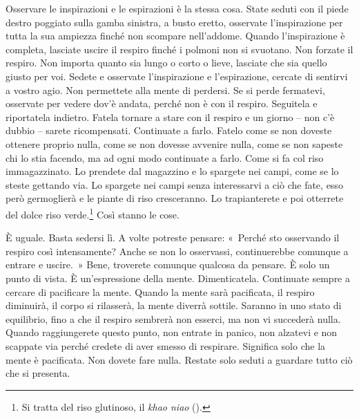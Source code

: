 Osservare le inspirazioni e le espirazioni è la stessa cosa. State
seduti con il piede destro poggiato sulla gamba sinistra, a busto
eretto, osservate l'inspirazione per tutta la sua ampiezza finché non
scompare nell'addome. Quando l'inspirazione è completa, lasciate uscire
il respiro finché i polmoni non si svuotano. Non forzate il respiro. Non
importa quanto sia lungo o corto o lieve, lasciate che sia quello giusto
per voi. Sedete e osservate l'inspirazione e l'espirazione, cercate di
sentirvi a vostro agio. Non permettete alla mente di perdersi. Se si
perde fermatevi, osservate per vedere dov'è andata, perché non è con il
respiro. Seguitela e riportatela indietro. Fatela tornare a stare con il
respiro e un giorno -- non c'è dubbio -- sarete ricompensati. Continuate
a farlo. Fatelo come se non doveste ottenere proprio nulla, come se non
dovesse avvenire nulla, come se non sapeste chi lo stia facendo, ma ad
ogni modo continuate a farlo. Come si fa col riso immagazzinato. Lo
prendete dal magazzino e lo spargete nei campi, come se lo steste
gettando via. Lo spargete nei campi senza interessarvi a ciò che fate,
esso però germoglierà e le piante di riso cresceranno. Lo trapianterete
e poi otterrete del dolce riso verde.\footnote{Si tratta del riso
  glutinoso, il \emph{khao niao} ().} Così stanno le cose.

È uguale. Basta sedersi lì. A volte potreste pensare: «~Perché sto
osservando il respiro così intensamente? Anche se non lo osservassi,
continuerebbe comunque a entrare e uscire.~» Bene, troverete comunque
qualcosa da pensare. È solo un punto di vista. È un'espressione della
mente. Dimenticatela. Continuate sempre a cercare di pacificare la
mente. Quando la mente sarà pacificata, il respiro diminuirà, il corpo
si rilasserà, la mente diverrà sottile. Saranno in uno stato di
equilibrio, fino a che il respiro sembrerà non esserci, ma non vi
succederà nulla. Quando raggiungerete questo punto, non entrate in
panico, non alzatevi e non scappate via perché credete di aver smesso di
respirare. Significa solo che la mente è pacificata. Non dovete fare
nulla. Restate solo seduti a guardare tutto ciò che si presenta.

